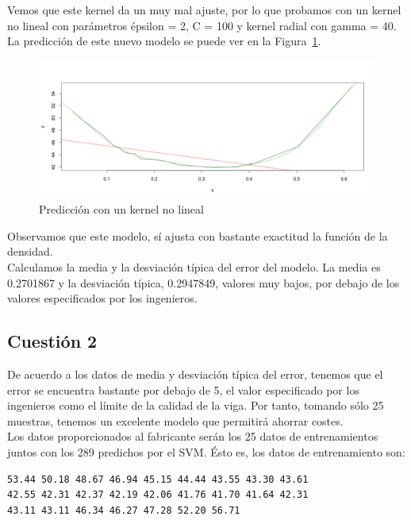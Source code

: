 \documentclass[12pt,a4paper,twoside,openright,titlepage,final]{article}
\begin{document}
Vemos que este kernel da un muy mal ajuste, por lo que probamos con un kernel no lineal con parámetros épsilon = 2, C = 100 y kernel radial con gamma = 40. La predicción de este nuevo modelo se puede ver en la Figura~\ref{fig:plot_kernel_no_lineal}.\\

\begin{figure}
\centering
\includegraphics[width=0.8\linewidth]{imagenes/plot_kernel_no_lineal}
\caption{Predicción con un kernel no lineal}
\label{fig:plot_kernel_no_lineal}
\end{figure}

Observamos que este modelo, sí ajusta con bastante exactitud la función de la densidad.\\

Calculamos la media y la desviación típica del error del modelo. La media es 0.2701867 y la desviación típica, 0.2947849, valores muy bajos, por debajo de los valores especificados por los ingenieros.

\subsection{Cuestión 2}

De acuerdo a los datos de media y desviación típica del error, tenemos que el error se encuentra bastante por debajo de 5, el valor especificado por los ingenieros como el límite de la calidad de la viga. Por tanto, tomando sólo 25 muestras, tenemos un excelente modelo que permitirá ahorrar costes.\\

Los datos proporcionados al fabricante serán los 25 datos de entrenamientos juntos con los 289 predichos por el SVM. Ésto es, los datos de entrenamiento son:

\begin{verbatim}
53.44 50.18 48.67 46.94 45.15 44.44 43.55 43.30 43.61 
42.55 42.31 42.37 42.19 42.06 41.76 41.70 41.64 42.31 
43.11 43.11 46.34 46.27 47.28 52.20 56.71
\end{verbatim}
\end{document}

